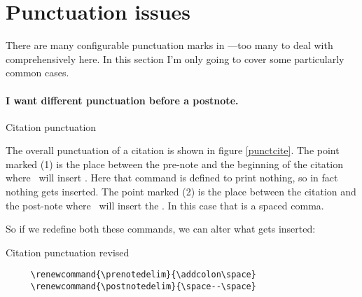 \section{Punctuation issues}\label{sec:punctuation}

There are many configurable punctuation marks in \biblatex---too many
to deal with comprehensively here. In this section I'm only going to
cover some particularly common cases.

\paragraph{I want different punctuation before a postnote.}
\begin{marginfigure}
\vspace{3pt}%
\caption{Citation punctuation}\label{punctcite}
\end{marginfigure}
The overall punctuation of a citation is shown in figure
\ref{punctcite}. The point marked (1) is the place between the
pre-note and the beginning of the citation where \biblatex\ will
insert . Here that command is defined to print
nothing, so in fact nothing gets inserted. The point marked (2) is the
place between the citation and the post-note where \biblatex\ will
insert the . In this case that is a spaced comma.

So if we redefine both these commands, we can alter what gets
inserted:\begin{marginfigure}[12ex]
 \vspace{3pt}%
\caption{Citation punctuation revised}\label{punctcite2}
\end{marginfigure}
\begin{Verbatim}
     \renewcommand{\prenotedelim}{\addcolon\space}
     \renewcommand{\postnotedelim}{\space--\space}
\end{Verbatim}

